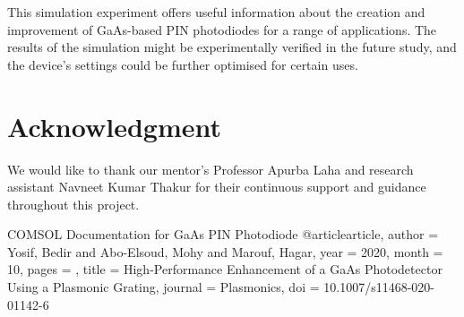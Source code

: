 \documentclass[conference]{IEEEtran}
\begin{document}
This simulation experiment offers useful information about the creation and improvement of GaAs-based PIN photodiodes for a range of applications. The results of the simulation might be experimentally verified in the future study, and the device's settings could be further optimised for certain uses.

\section*{Acknowledgment}

We would like to thank our mentor's Professor Apurba Laha and research assistant Navneet Kumar Thakur for their continuous support and guidance throughout this project.


\begin{thebibliography}{00}
 COMSOL Documentation for GaAs PIN Photodiode
 @article{article,
author = {Yosif, Bedir and Abo-Elsoud, Mohy and Marouf, Hagar},
year = {2020},
month = {10},
pages = {},
title = {High-Performance Enhancement of a GaAs Photodetector Using a Plasmonic Grating},
journal = {Plasmonics},
doi = {10.1007/s11468-020-01142-6}
}

\end{thebibliography}
\end{document}
